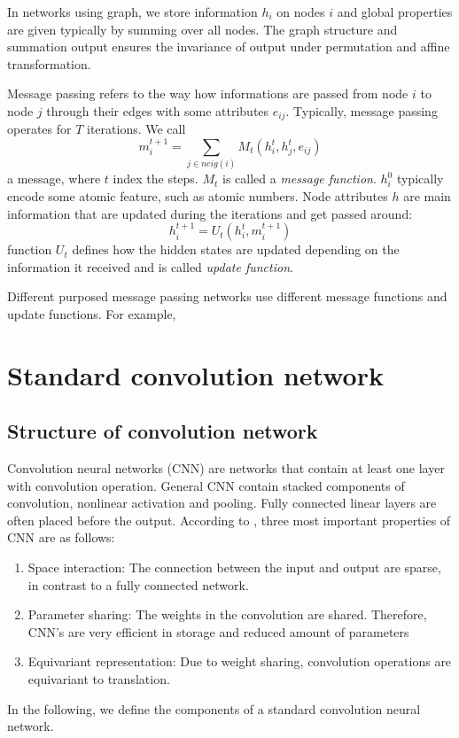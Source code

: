 \documentclass{IEEEtran}
\begin{document}
In networks using graph, we store information $h_i$ on nodes $i$ and global properties are given typically
by summing over all nodes. The graph structure and summation output ensures the invariance of output
under permutation and affine transformation. 

Message passing refers to the way how informations are passed from node $i$ to node $j$ through their 
edges with some attributes $e_{ij}$. Typically, message passing operates for $T$ iterations. We call
\begin{equation}
    m_{i}^{t+1} = \sum_{j\in neig(i)} M_t(h^t_i, h^t_j, e_{ij})
\end{equation}
a message, 
where $t$ index the steps. $M_t$ is called a \emph{message function}. $h^0_i$ typically encode some atomic
feature, such as atomic numbers. 
Node attributes $h$ are main information that are updated during the iterations and get passed around:
\begin{equation}
    h^{t+1}_i = U_t(h_i^t, m_{i}^{t+1})
\end{equation}
function $U_t$ defines how the hidden states are updated depending on the information it received and is called
\emph{update function}. 

Different purposed message passing networks use different message functions and update functions. 
For example, 


\section{Standard convolution network}
\subsection*{Structure of convolution network}
Convolution neural networks (CNN) are networks that contain at least one layer with convolution operation. 
General CNN contain stacked components of convolution, nonlinear activation and pooling. 
Fully connected linear layers are often placed before the output.
According to \cite{goodfellow_deep_2016}, 
three most important properties of CNN are as follows:
\begin{enumerate}
    \item Space interaction: The connection between the input and output are sparse, in contrast to a fully connected network.
    \item Parameter sharing: The weights in the convolution are shared. Therefore, CNN's are very efficient in storage and reduced amount of parameters 
    \item Equivariant representation: Due to weight sharing, convolution operations are equivariant to translation.
\end{enumerate}
In the following, we define the components of a standard convolution neural network.
\end{document}
